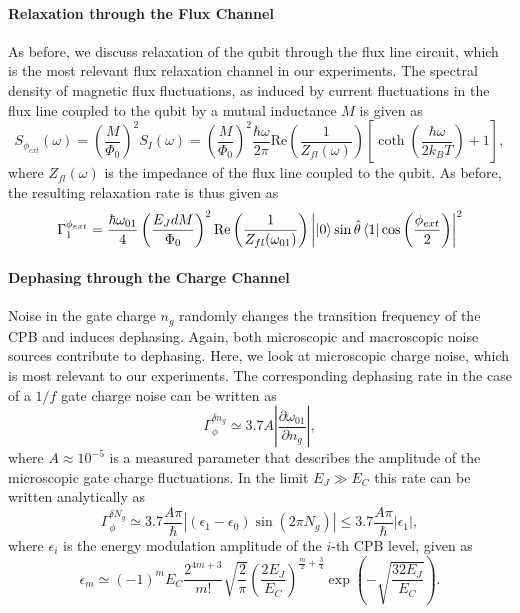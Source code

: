 \paragraph{Relaxation through the Flux Channel}

As before, we discuss relaxation of the qubit through the flux line circuit, which is the most relevant flux relaxation channel in our experiments. The spectral density of magnetic flux fluctuations, as induced by current fluctuations in the flux line coupled to the qubit by a mutual inductance $M$ is given as
%
\begin{equation}
S_{\phi_{ext}}(\omega) = \left(\frac{M}{\Phi_0}\right)^2 S_I(\omega) = \left(\frac{M}{\Phi_0}\right)^2\frac{\hbar\omega}{2\pi}\mathrm{Re}\left(\frac{1}{Z_{fl}(\omega)}\right)\left[\coth{\left(\frac{\hbar\omega}{2k_B T}\right)}+1\right],
\end{equation}
%
where $Z_{fl}(\omega)$ is the impedance of the flux line coupled to the qubit. As before, the resulting relaxation rate is thus given as
%
\begin{equation}
\Gamma_1^{\phi_{ext}} = \frac{\hbar\omega_{01}}{4}\left(\frac{E_J d M}{\Phi_0}\right)^2 \mathrm{Re}\left(\frac{1}{Z_{fl}(\omega_{01})}\right)\left|\left| 0 \right>\sin{\hat{\theta}}\left< 1 \right|\cos{\left(\frac{\phi_{ext}}{2}\right)}\right|^2 \label{eq:flux_relaxation_rate}
\end{equation}
%

\paragraph{Dephasing through the Charge Channel}

Noise in the gate charge $n_g$ randomly changes the transition frequency of the CPB and induces dephasing. Again, both microscopic and macroscopic noise sources contribute to dephasing. Here, we look at microscopic charge noise, which is most relevant to our experiments. The corresponding dephasing rate in the case of a $1/f$ gate charge noise can be written as \citep{cottet_implementation_2002,van_harlingen_decoherence_2004}
%
\begin{equation}
\Gamma_\phi^{\delta n_g} \simeq 3.7A \left|\frac{\partial \omega_{01}}{\partial n_g}\right|,
\end{equation}
%
where $A\approx 10^{-5}$ is a measured parameter that describes the amplitude of the microscopic gate charge fluctuations. In the limit $E_J\gg E_C$ this rate can be written analytically as
%
\begin{equation}
\Gamma_\phi^{\delta N_g} \simeq 3.7\frac{A\pi}{\hbar}\left| (\epsilon_1-\epsilon_0)\sin{\left(2\pi N_g\right)}\right| \leq 3.7\frac{A\pi}{\hbar}|\epsilon_1|,
\end{equation}
%
where $\epsilon_i$ is the energy modulation amplitude of the $i$-th CPB level, given as \citep{koch_charge-insensitive_2007}
%
\begin{equation}
\epsilon_m\simeq (-1)^m E_C\frac{2^{4m+3}}{m!}\sqrt{\frac{2}{\pi}}\left(\frac{2E_J}{E_C}\right)^{\frac{m}{2}+\frac{3}{4}}\exp{\left(-\sqrt{\frac{32E_J}{E_C}}\right)}. \label{eq:charge_dephasing_rate}
\end{equation}
%

